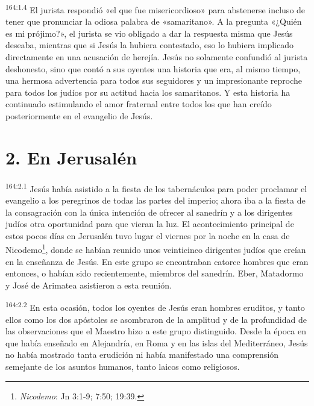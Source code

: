 \par 
\textsuperscript{164:1.4} El jurista respondió «el que fue misericordioso» para abstenerse incluso de tener que pronunciar la odiosa palabra de «samaritano». A la pregunta «¿Quién es mi prójimo?», el jurista se vio obligado a dar la respuesta misma que Jesús deseaba, mientras que si Jesús la hubiera contestado, eso lo hubiera implicado directamente en una acusación de herejía. Jesús no solamente confundió al jurista deshonesto, sino que contó a sus oyentes una historia que era, al mismo tiempo, una hermosa advertencia para todos sus seguidores y un impresionante reproche para todos los judíos por su actitud hacia los samaritanos. Y esta historia ha continuado estimulando el amor fraternal entre todos los que han creído posteriormente en el evangelio de Jesús.

\section*{2. En Jerusalén}
\par 
\textsuperscript{164:2.1} Jesús había asistido a la fiesta de los tabernáculos para poder proclamar el evangelio a los peregrinos de todas las partes del imperio; ahora iba a la fiesta de la consagración con la única intención de ofrecer al sanedrín y a los dirigentes judíos otra oportunidad para que vieran la luz. El acontecimiento principal de estos pocos días en Jerusalén tuvo lugar el viernes por la noche en la casa de Nicodemo\footnote{\textit{Nicodemo}: Jn 3:1-9; 7:50; 19:39.}, donde se habían reunido unos veinticinco dirigentes judíos que creían en la enseñanza de Jesús. En este grupo se encontraban catorce hombres que eran entonces, o habían sido recientemente, miembros del sanedrín. Eber, Matadormo y José de Arimatea asistieron a esta reunión.

\par 
\textsuperscript{164:2.2} En esta ocasión, todos los oyentes de Jesús eran hombres eruditos, y tanto ellos como los dos apóstoles se asombraron de la amplitud y de la profundidad de las observaciones que el Maestro hizo a este grupo distinguido. Desde la época en que había enseñado en Alejandría, en Roma y en las islas del Mediterráneo, Jesús no había mostrado tanta erudición ni había manifestado una comprensión semejante de los asuntos humanos, tanto laicos como religiosos.

